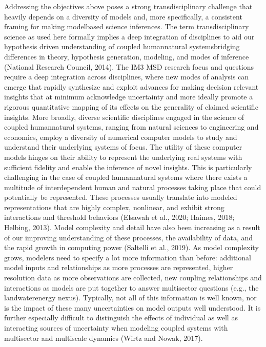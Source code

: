 \documentclass[letterpaper,10pt,english]{sphinxmanual}
\begin{document}
\sphinxAtStartPar
Addressing the objectives above poses a strong transdisciplinary challenge that heavily depends on a diversity of models and, more specifically, a consistent framing for making model\sphinxhyphen{}based science inferences. The term transdisciplinary science as used here formally implies a deep integration of disciplines to aid our hypothesis driven understanding of coupled human\sphinxhyphen{}natural systems\textendash{}bridging differences in theory, hypothesis generation, modeling, and modes of inference (National Research Council, 2014). The IM3 MSD research focus and questions require a deep integration across disciplines, where new modes of analysis can emerge that rapidly synthesize and exploit advances for making decision relevant insights that at minimum acknowledge uncertainty and more ideally promote a rigorous quantitative mapping of its effects on the generality of claimed scientific insights. More broadly, diverse scientific disciplines engaged in the science of coupled human\sphinxhyphen{}natural systems, ranging from natural sciences to engineering and economics, employ a diversity of numerical computer models to study and understand their underlying systems of focus. The utility of these computer models hinges on their ability to represent the underlying real systems with sufficient fidelity and enable the inference of novel insights. This is particularly challenging in the case of coupled human\sphinxhyphen{}natural systems where there exists a multitude of interdependent human and natural processes taking place that could potentially be represented. These processes usually translate into modeled representations that are highly complex, non\sphinxhyphen{}linear, and exhibit strong interactions and threshold behaviors (Elsawah et al., 2020; Haimes, 2018; Helbing, 2013). Model complexity and detail have also been increasing as a result of our improving understanding of these processes, the availability of data, and the rapid growth in computing power (Saltelli et al., 2019). As model complexity grows, modelers need to specify a lot more information than before: additional model inputs and relationships as more processes are represented, higher resolution data as more observations are collected, new coupling relationships and interactions as models are put together to answer multisector questions (e.g., the land\sphinxhyphen{}water\sphinxhyphen{}energy nexus). Typically, not all of this information is well known, nor is the impact of these many uncertainties on model outputs well understood. It is further especially difficult to distinguish the effects of individual as well as interacting sources of uncertainty when modeling coupled systems with multisector and multiscale dynamics (Wirtz and Nowak, 2017).
\end{document}
